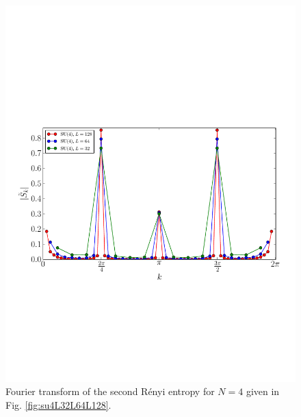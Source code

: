 \documentclass[aps,prb,reprint,floatfix]{revtex4-1}
\begin{document}
\begin{figure}
\centerline{\includegraphics[angle=0,width=1.0\columnwidth]{EE_fourierSu4L32L64L128.pdf}}
\caption{Fourier transform of the second R\'{e}nyi entropy for $N=4$ given in Fig. \ref{fig:su4L32L64L128}.}
\label{fig:EEfouriersu4}
\end{figure}
\end{document}
